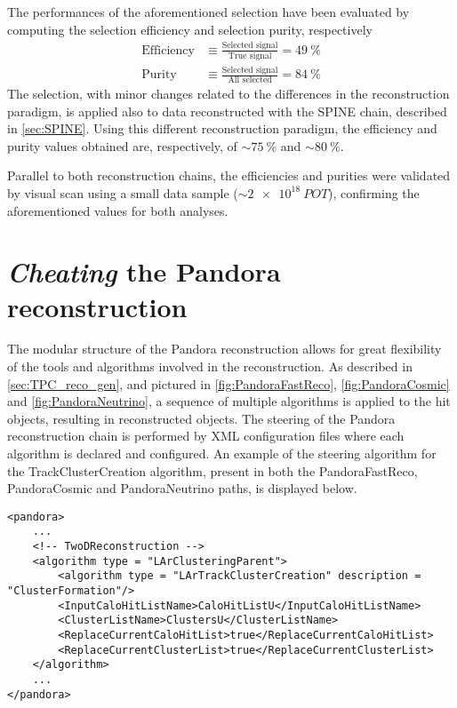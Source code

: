 The performances of the aforementioned selection have been  evaluated \cite{artero_pons_2024_13841852, particles8010018} by computing the selection efficiency and selection purity, respectively \begin{equation}
    \begin{aligned}
        \mathrm{Efficiency} &\equiv \frac{\text{Selected signal}}{\text{True signal}} = \SI{49}{\percent} \\
        \mathrm{Purity} &\equiv \frac{\text{Selected signal}}{\text{All selected}} = \SI{84}{\percent}
    \end{aligned}
\end{equation} The selection, with minor changes related to the differences in the reconstruction paradigm, is applied also to data reconstructed with the SPINE chain, described in \autoref{sec:SPINE}. Using this different reconstruction paradigm, the efficiency and purity values obtained are, respectively, of ${\sim}\SI{75}{\percent}$ and ${\sim}\SI{80}{\percent}$. 

Parallel to both reconstruction chains, the efficiencies and purities were validated by visual scan using a small data sample (${\sim}\SI{2e18}{POT}$), confirming the aforementioned values for both analyses. 

\section{\emph{Cheating} the Pandora reconstruction} 

The modular structure of the Pandora reconstruction allows for great flexibility of the tools and algorithms involved in the reconstruction. As described in \autoref{sec:TPC_reco_gen}, and pictured in \autoref{fig:PandoraFastReco}, \ref{fig:PandoraCosmic} and \ref{fig:PandoraNeutrino}, a sequence of multiple algorithms is applied to the hit objects, resulting in reconstructed objects. The steering of the Pandora reconstruction chain is performed by XML configuration files where each algorithm is declared and configured. An example of the steering algorithm for the TrackClusterCreation algorithm, present in both the PandoraFastReco, PandoraCosmic and PandoraNeutrino paths, is displayed below.

\begin{lstlisting}[style=xmlstyle]
<pandora>
    ...
    <!-- TwoDReconstruction -->
    <algorithm type = "LArClusteringParent">
        <algorithm type = "LArTrackClusterCreation" description = "ClusterFormation"/>
        <InputCaloHitListName>CaloHitListU</InputCaloHitListName>
        <ClusterListName>ClustersU</ClusterListName>
        <ReplaceCurrentCaloHitList>true</ReplaceCurrentCaloHitList>
        <ReplaceCurrentClusterList>true</ReplaceCurrentClusterList>
    </algorithm>
    ...
</pandora>
\end{lstlisting}

